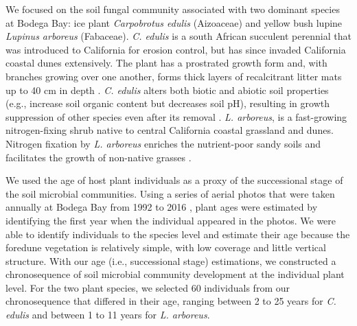 We focused on the soil fungal community associated with two dominant species at Bodega Bay: ice plant \textit{Carpobrotus edulis} (Aizoaceae) and yellow bush lupine \textit{Lupinus arboreus} (Fabaceae).
\textit{C. edulis} is a south African succulent perennial that was introduced to California for erosion control, but has since invaded California coastal dunes extensively. The plant has a prostrated growth form and, with branches growing over one another, forms thick layers of recalcitrant litter mats up to 40 cm in depth \citep{DAntonio1990}. \textit{C. edulis} alters both biotic \citep{delaPena2010} and abiotic soil properties (e.g., increase soil organic content but decreases soil pH), resulting in growth suppression of other species even after its removal \citep{Conser2009, Novoa2013, Novoa2014}.
\textit{L. arboreus}, is a fast-growing nitrogen-fixing shrub native to central California coastal grassland and dunes. Nitrogen fixation by \textit{L. arboreus} enriches the nutrient-poor sandy soils and facilitates the growth of non-native grasses \citep{Maron1996, Maron2001}. 
\par


We used the age of host plant individuals as a proxy of the successional stage of the soil microbial communities. 
Using a series of aerial photos that were taken annually at Bodega Bay from 1992 to 2016 \citep{Danin1998}, plant ages were estimated by identifying the first year when the individual appeared in the photos. 
We were able to identify individuals to the species level and estimate their age because the foredune vegetation is relatively simple, with low coverage and little vertical structure.
With our age (i.e., successional stage) estimations, we constructed a chronosequence of soil microbial community development at the individual plant level. For the two plant species, we selected 60 individuals from our chronosequence that differed in their age, ranging between 2 to 25 years for \textit{C. edulis} and between 1 to 11 years for \textit{L. arboreus}. 
\par



